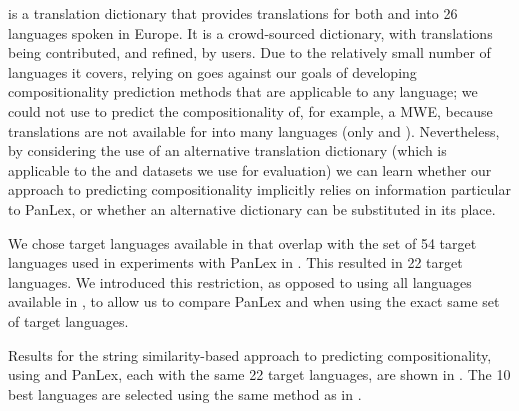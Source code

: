 \documentclass[output=paper,modfonts,nonflat]{langsci/langscibook}
\begin{document}
\dictcc is a translation dictionary that provides translations for
both  and  into 26 languages spoken in Europe. It is a
crowd-sourced dictionary, with translations being contributed, and
refined, by users. Due to the relatively small number of languages it
covers, relying on \dictcc goes against our goals of developing
compositionality prediction methods that are applicable to any
language; we could not use \dictcc to predict the compositionality of,
for example, a  MWE, because translations are not available for
 into many languages (only  and ). Nevertheless, by
considering the use of an alternative translation dictionary (which is
applicable to the  and  datasets we use for evaluation)
we can learn whether our approach to predicting compositionality
implicitly relies on information particular to PanLex, or whether an
alternative dictionary can be substituted in its place.

We chose target languages available in \dictcc that overlap with the
set of 54 target languages used in experiments with PanLex in
. This resulted in 22 target
languages. We introduced this restriction, as opposed to using all
languages available in \dictcc, to allow us to compare PanLex and
\dictcc when using the exact same set of target languages.

Results for the string similarity-based approach to predicting
compositionality, using \dictcc and PanLex, each with the same 22
target languages, are shown in
. The 10 best languages are
selected using the same method as in .

\end{document}
